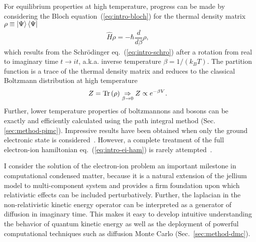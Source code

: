 For equilibrium properties at high temperature, progress can be made by considering the Bloch equation~(\ref{eq:intro-bloch}) for the thermal density matrix $\rho\equiv\ket{\Psi}\bra{\Psi}$
\begin{align} \label{eq:intro-bloch}
\hat{H} \rho = -\hbar\dfrac{d}{d\beta}\rho,
\end{align}
which results from the Schr\"odinger eq.~(\ref{eq:intro-schro}) after a rotation from real to imaginary time $t\rightarrow it$, a.k.a. inverse temperature $\beta=1/(k_BT)$.
The partition function is a trace of the thermal density matrix and reduces to the classical Boltzmann distribution at high temperature
\begin{align}
Z=\text{Tr}\left(\rho\right) \underset{\beta\rightarrow 0}{\Rightarrow} Z \propto e^{-\beta V}.
\end{align}
Further, lower temperature properties of boltzmannons and bosons can be exactly and efficiently calculated using the path integral method (Sec.\ref{sec:method-pimc}). Impressive results have been obtained when only the ground electronic state is considered~\cite{Pierleoni2016b,Celliers2018}.
However, a complete treatment of the full electron-ion hamiltonian eq.~(\ref{eq:intro-ei-ham}) is rarely attempted~\cite{Ceperley1981,Natoli1995}.

I consider the solution of the electron-ion problem an important milestone in computational condensed matter, because it is a natural extension of the jellium model to multi-component system and provides a firm foundation upon which relativistic effects can be included perturbatively. Further, the laplacian in the non-relativistic kinetic energy operator can be interpreted as a generator of diffusion in imaginary time. This makes it easy to develop intuitive understanding the behavior of quantum kinetic energy as well as the deployment of powerful computational techniques such as diffusion Monte Carlo (Sec.~\ref{sec:method-dmc}).


